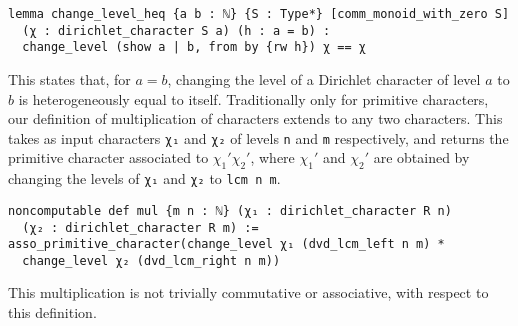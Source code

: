 \documentclass[a4paper,UKenglish,cleveref, autoref, thm-restate]{lipics-v2021}
\newcommand{\lean}[1]{\texttt{#1}\xspace} %
\begin{document}
\begin{lstlisting}
lemma change_level_heq {a b : ℕ} {S : Type*} [comm_monoid_with_zero S] 
  (χ : dirichlet_character S a) (h : a = b) : 
  change_level (show a | b, from by {rw h}) χ == χ
\end{lstlisting}
This states that, for $a = b$, changing the level of a Dirichlet character of level $a$ to $b$ is heterogeneously equal to itself. \newline
Traditionally only for primitive characters, our definition of multiplication of characters 
extends to any two characters. This takes as input characters \lean{χ₁} and \lean{χ₂} of levels \lean{n} and \lean{m} respectively, and returns the primitive 
character associated to $\chi_1' \chi_2'$, where $\chi_1'$ and $\chi_2'$ are obtained by changing the levels 
of \lean{χ₁} and \lean{χ₂} to \lean{lcm n m}. 
\begin{lstlisting}
noncomputable def mul {m n : ℕ} (χ₁ : dirichlet_character R n) 
  (χ₂ : dirichlet_character R m) :=
asso_primitive_character(change_level χ₁ (dvd_lcm_left n m) * 
  change_level χ₂ (dvd_lcm_right n m))
\end{lstlisting} 
This multiplication is not trivially commutative or associative, with respect to this definition. 
\end{document}
